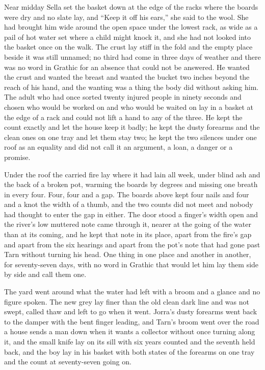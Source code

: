 Near midday Sella set the basket down at the edge of the racks where the boards were dry and no slate lay, and “Keep it off his ears,” she said to the wool. She had brought him wide around the open space under the lowest rack, as wide as a pail of hot water set where a child might knock it, and she had not looked into the basket once on the walk. The crust lay stiff in the fold and the empty place beside it was still unnamed; no third had come in three days of weather and there was no word in Grathic for an absence that could not be answered. He wanted the crust and wanted the breast and wanted the bucket two inches beyond the reach of his hand, and the wanting was a thing the body did without asking him. The adult who had once sorted twenty injured people in ninety seconds and chosen who would be worked on and who would be waited on lay in a basket at the edge of a rack and could not lift a hand to any of the three. He kept the count exactly and let the house keep it badly; he kept the dusty forearms and the clean ones on one tray and let them stay two; he kept the two silences under one roof as an equality and did not call it an argument, a loan, a danger or a promise.

Under the roof the carried fire lay where it had lain all week, under blind ash and the back of a broken pot, warming the boards by degrees and missing one breath in every four. Four, four and a gap. The boards above kept four nails and four and a knot the width of a thumb, and the two counts did not meet and nobody had thought to enter the gap in either. The door stood a finger's width open and the river's low muttered note came through it, nearer at the going of the water than at its coming, and he kept that note in its place, apart from the fire's gap and apart from the six hearings and apart from the pot's note that had gone past Tarn without turning his head. One thing in one place and another in another, for seventy-seven days, with no word in Grathic that would let him lay them side by side and call them one.

The yard went around what the water had left with a broom and a glance and no figure spoken. The new grey lay finer than the old clean dark line and was not swept, called thaw and left to go when it went. Jorra's dusty forearms went back to the damper with the bent finger leading, and Tarn's broom went over the road a house sends a man down when it wants a collector without once turning along it, and the small knife lay on its sill with six years counted and the seventh held back, and the boy lay in his basket with both states of the forearms on one tray and the count at seventy-seven going on.
